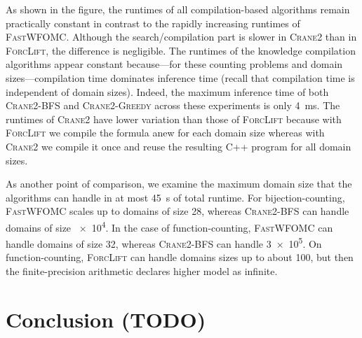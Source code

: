 \documentclass{article}
\theoremstyle{definition}
\newcommand{\Cranetwo}{\textsc{Crane2}}
\newcommand{\Cranebfs}{\textsc{Crane2-BFS}}
\newcommand{\Cranegreedy}{\textsc{Crane2-Greedy}}
\begin{document}
As shown in the figure, the runtimes of all compilation-based algorithms remain
practically constant in contrast to the rapidly increasing runtimes of
\textsc{FastWFOMC}. Although the search/compilation part is slower in
\Cranetwo{} than in \textsc{ForcLift}, the difference is negligible. The
runtimes of the knowledge compilation algorithms appear constant because---for
these counting problems and domain sizes---compilation time dominates inference
time (recall that compilation time is independent of domain sizes). Indeed, the
maximum inference time of both \Cranebfs{} and \Cranegreedy{} across these
experiments is only \SI{4}{\milli\second}. The runtimes of \Cranetwo{} have
lower variation than those of \textsc{ForcLift} because with \textsc{ForcLift}
we compile the formula anew for each domain size whereas with \Cranetwo{} we
compile it once and reuse the resulting C++ program for all domain sizes.

As another point of comparison, we examine the maximum domain size that the
algorithms can handle in at most \SI{45}{\second} of total runtime. For
bijection-counting, \textsc{FastWFOMC} scales up to domains of size 28, whereas
\Cranebfs{} can handle domains of size \num{e4}. In the case of
function-counting, \textsc{FastWFOMC} can handle domains of size 32, whereas
\Cranebfs{} can handle \num{3e5}. On function-counting, \textsc{ForcLift} can
handle domains sizes up to about 100, but then the finite-precision arithmetic
declares higher model as infinite.


\section{Conclusion (TODO)}
\end{document}
